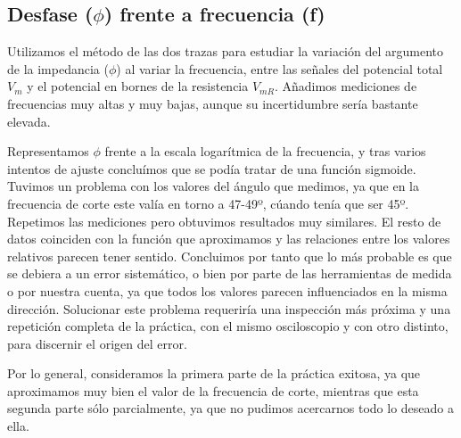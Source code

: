 \documentclass[12pt, a4paper, titlepage]{article}
\begin{document}
  \subsection{Desfase ($\phi$) frente a frecuencia (f)}

  Utilizamos el método de las dos trazas para estudiar la variación del argumento de la impedancia ($\phi$) al variar la frecuencia, entre las señales del potencial total $V_m$ y el potencial en bornes de la resistencia $V_{mR}$. Añadimos mediciones de frecuencias muy altas y muy bajas, aunque su incertidumbre sería bastante elevada.

  Representamos $\phi$ frente a la escala logarítmica de la frecuencia, y tras varios intentos de ajuste concluímos que se podía tratar de una función sigmoide. Tuvimos un problema con los valores del ángulo que medimos, ya que en la frecuencia de corte este valía en torno a 47-49º, cúando tenía que ser 45º. Repetimos las mediciones pero obtuvimos resultados muy similares. El resto de datos coinciden con la función que aproximamos y las relaciones entre los valores relativos parecen tener sentido. Concluimos por tanto que lo más probable es que se debiera a un error sistemático, o bien por parte de las herramientas de medida o por nuestra cuenta, ya que todos los valores parecen influenciados en la misma dirección. Solucionar este problema requeriría una inspección más próxima y una repetición completa de la práctica, con el mismo osciloscopio y con otro distinto, para discernir el origen del error.

  Por lo general, consideramos la primera parte de la práctica exitosa, ya que aproximamos muy bien el valor de la frecuencia de corte, mientras que esta segunda parte sólo parcialmente, ya que no pudimos acercarnos todo lo deseado a ella.
\end{document}
